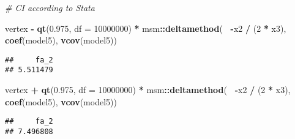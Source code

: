 \documentclass[
]{article}
\newenvironment{Shaded}{\begin{snugshade}}{\end{snugshade}}
\newcommand{\CommentTok}[1]{\textcolor[rgb]{0.56,0.35,0.01}{\textit{#1}}}
\newcommand{\DataTypeTok}[1]{\textcolor[rgb]{0.13,0.29,0.53}{#1}}
\newcommand{\DecValTok}[1]{\textcolor[rgb]{0.00,0.00,0.81}{#1}}
\newcommand{\FloatTok}[1]{\textcolor[rgb]{0.00,0.00,0.81}{#1}}
\newcommand{\KeywordTok}[1]{\textcolor[rgb]{0.13,0.29,0.53}{\textbf{#1}}}
\newcommand{\NormalTok}[1]{#1}
\newcommand{\OperatorTok}[1]{\textcolor[rgb]{0.81,0.36,0.00}{\textbf{#1}}}
\newcommand{\StringTok}[1]{\textcolor[rgb]{0.31,0.60,0.02}{#1}}
\begin{document}
\begin{Shaded}
\begin{Highlighting}[]
\CommentTok{# CI according to Stata}

\NormalTok{vertex }\OperatorTok{-}\StringTok{ }\KeywordTok{qt}\NormalTok{(}\FloatTok{0.975}\NormalTok{, }\DataTypeTok{df =} \DecValTok{10000000}\NormalTok{) }\OperatorTok{*}\StringTok{ }\NormalTok{msm}\OperatorTok{::}\KeywordTok{deltamethod}\NormalTok{(}\OperatorTok{~}\StringTok{ }\OperatorTok{-}\NormalTok{x2 }\OperatorTok{/}\StringTok{ }\NormalTok{(}\DecValTok{2} \OperatorTok{*}\StringTok{ }\NormalTok{x3), }\KeywordTok{coef}\NormalTok{(model5), }\KeywordTok{vcov}\NormalTok{(model5))}
\end{Highlighting}
\end{Shaded}

\begin{verbatim}
##     fa_2 
## 5.511479
\end{verbatim}

\begin{Shaded}
\begin{Highlighting}[]
\NormalTok{vertex }\OperatorTok{+}\StringTok{ }\KeywordTok{qt}\NormalTok{(}\FloatTok{0.975}\NormalTok{, }\DataTypeTok{df =} \DecValTok{10000000}\NormalTok{) }\OperatorTok{*}\StringTok{ }\NormalTok{msm}\OperatorTok{::}\KeywordTok{deltamethod}\NormalTok{(}\OperatorTok{~}\StringTok{ }\OperatorTok{-}\NormalTok{x2 }\OperatorTok{/}\StringTok{ }\NormalTok{(}\DecValTok{2} \OperatorTok{*}\StringTok{ }\NormalTok{x3), }\KeywordTok{coef}\NormalTok{(model5), }\KeywordTok{vcov}\NormalTok{(model5))}
\end{Highlighting}
\end{Shaded}

\begin{verbatim}
##     fa_2 
## 7.496808
\end{verbatim}

\begin{Shaded}
\end{Shaded}
\end{document}

